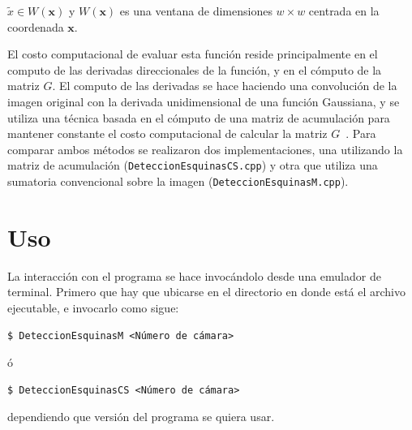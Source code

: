 \documentclass[12pt,letterpaper,notitlepage]{report}
\newlength{\spacing} \setlength{\spacing}{\baselineskip}
\newcommand{\nspace}[1]{\setlength{\baselineskip}{#1\spacing}}
\newenvironment{linespacing}[1]{\nspace{#1}}{}
\begin{document}
{\begin{linespacing}{1.5}
\bigskip
                             
$\tilde{x} \in W(\mathbf{x})$ y $W(\mathbf{x})$ es una ventana de dimensiones $ w \times w$ centrada en la coordenada $\mathbf{x}$. 

El costo computacional de evaluar esta función reside principalmente
en el computo de las derivadas direccionales de la función, y en el
cómputo de la matriz $G$. El computo de las derivadas se hace haciendo
una convolución de la imagen original con la derivada unidimensional
de una función Gaussiana, y se utiliza una técnica basada en el
cómputo de una matriz de acumulación para mantener constante el costo
computacional de calcular la matriz $G$~\citep{Simard+ETAL1999,
  Viola+Jones2004}. Para comparar ambos métodos se realizaron dos
implementaciones, una utilizando la matriz de acumulación
(\verb!DeteccionEsquinasCS.cpp!) y otra que utiliza una sumatoria
convencional sobre la imagen (\verb!DeteccionEsquinasM.cpp!).


\section{Uso}

La interacción con el programa se hace invocándolo desde una emulador de terminal. Primero que hay que ubicarse en el directorio en donde está el archivo ejecutable, e invocarlo como sigue:
\begin{verbatim}
$ DeteccionEsquinasM <Número de cámara>
\end{verbatim}
ó
\begin{verbatim}
$ DeteccionEsquinasCS <Número de cámara>
\end{verbatim}

dependiendo que versión del programa se quiera usar. 

\smallskip


\end{linespacing}}
\end{document}
